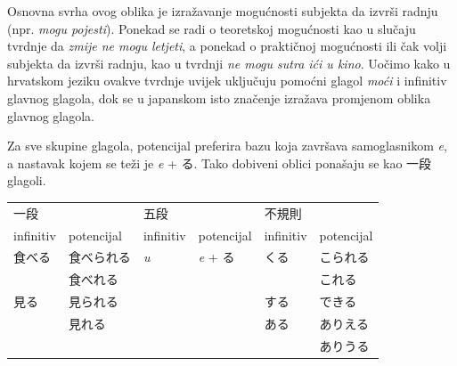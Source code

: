 	
\newpage
{}\footnotemark[1]

	
	Osnovna svrha ovog oblika je izražavanje mogućnosti subjekta da izvrši radnju (npr. \textit{mogu pojesti}).
	Ponekad se radi o teoretskoj mogućnosti kao u slučaju tvrdnje da \textit{zmije ne mogu letjeti}, a ponekad o praktičnoj mogućnosti ili čak volji subjekta da izvrši radnju, kao u tvrdnji \textit{ne mogu sutra ići u kino}.
	Uočimo kako u hrvatskom jeziku ovakve tvrdnje uvijek uključuju pomoćni glagol \textit{moći} i infinitiv glavnog glagola, dok se u japanskom isto značenje izražava promjenom oblika glavnog glagola.
	
	
	Za sve skupine glagola, potencijal preferira bazu koja završava samoglasnikom \textit{e}, a nastavak kojem se teži je \textit{e} + る.
	Tako dobiveni oblici ponašaju se kao 一段 glagoli.
	
	\begin{table}[h]
		\centering
			\begin{tabular}{l l l l l l}\toprule[2pt]
				一段 && 五段 && 不規則 &\\
				infinitiv & potencijal & infinitiv & potencijal & infinitiv & potencijal\\
				\midrule
				食べる & 食べられる & \textit{u} & \textit{e} + る & くる & こられる\\
				& 食べれる & & & & これる\footnotemark[3]\\
				見る & 見られる\footnotemark[2] & & & する & できる\\
				& 見れる & & & ある\footnotemark[4] & ありえる\\
				& & & & & ありうる\\
				\bottomrule[2pt]
			\end{tabular}
	\end{table}

	
